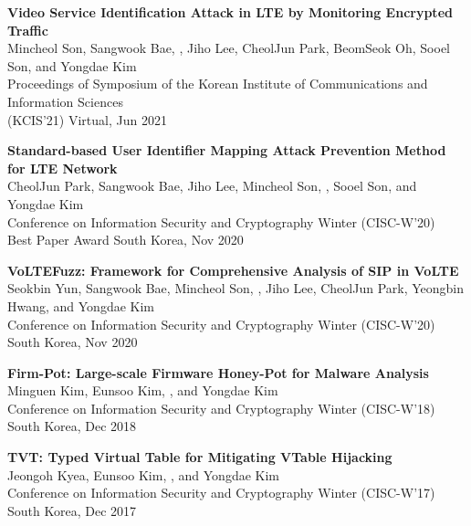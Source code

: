 \begin{enumerate}[label={[\arabic*]}, leftmargin=1.5em, resume]
    \item \textbf{Video Service Identification Attack in LTE by Monitoring Encrypted Traffic} \\
        {\small
            Mincheol Son, Sangwook Bae, , Jiho Lee, CheolJun Park, BeomSeok Oh, Sooel Son, and Yongdae Kim \\
            Proceedings of Symposium of the Korean Institute of Communications and Information Sciences \\ (KCIS'21)
        }
        \hfill {\small Virtual, Jun 2021}
    
    \item \textbf{Standard-based User Identifier Mapping Attack Prevention Method for LTE Network} \\
        {\small
            CheolJun Park, Sangwook Bae, Jiho Lee, Mincheol Son, ,
            Sooel Son, and Yongdae Kim \\
            Conference on Information Security and Cryptography Winter (CISC-W’20) \\
            Best Paper Award
        }
        \hfill {\small South Korea, Nov 2020}

    \item \textbf{VoLTEFuzz: Framework for Comprehensive Analysis of SIP in VoLTE} \\
        {\small
            Seokbin Yun, Sangwook Bae, Mincheol Son, , Jiho Lee, CheolJun Park, Yeongbin Hwang, and Yongdae Kim \\
            Conference on Information Security and Cryptography Winter (CISC-W’20)
        }
        \hfill {\small South Korea, Nov 2020}
        
    \item \textbf{Firm-Pot: Large-scale Firmware Honey-Pot for Malware Analysis} \\
        {\small
            Minguen Kim, Eunsoo Kim, , and Yongdae Kim \\
            Conference on Information Security and Cryptography Winter (CISC-W’18)
        }
        \hfill {\small South Korea, Dec 2018}
        
    \item \textbf{TVT: Typed Virtual Table for Mitigating VTable Hijacking} \\
        {\small
            Jeongoh Kyea, Eunsoo Kim, , and Yongdae Kim \\
            Conference on Information Security and Cryptography Winter (CISC-W’17)
        }
        \hfill {\small South Korea, Dec 2017}
        

\end{enumerate}
